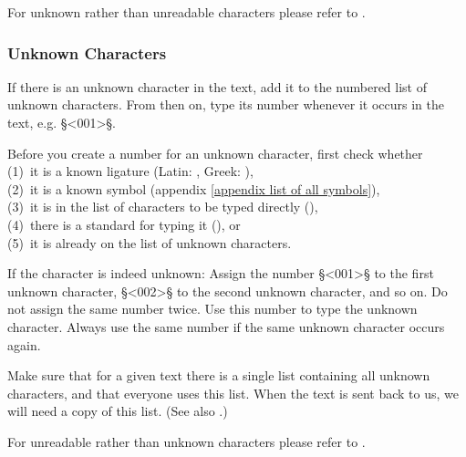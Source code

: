 \begin{crossref}
For unknown rather than unreadable characters please refer to . 
\end{crossref}


\subsubsection{Unknown Characters}
\label{section unknown characters}

\begin{mainrule}
If there is an unknown character in the text, add it to the numbered list of unknown characters. From then on, type its number whenever it occurs in the text, e.g. §<001>§.
\end{mainrule}
 
\begin{clarification}
Before you create a number for an unknown character, first check whether \\
(1)~it is a known ligature (Latin: , Greek: ), \\
(2)~it is a known symbol (appendix \ref{appendix list of all symbols}), \\
(3)~it is in the list of characters to be typed directly (), \\
(4)~there is a standard for typing it (), or \\
(5)~it is already on the list of unknown characters.
 \end{clarification}

\begin{clarification}
If the character is indeed unknown: Assign the number §<001>§ to the first unknown character, §<002>§ to the second unknown character, and so on. Do not assign the same number twice. Use this number to type the unknown character. Always use the same number if the same unknown character occurs again. 
\end{clarification}

\begin{note}
Make sure that for a given text there is a single list containing all unknown characters, and that everyone uses this list. When the text is sent back to us, we will need a copy of this list. (See also .)
\end{note}

\begin{crossref}
For unreadable rather than unknown characters please refer to .
\end{crossref}

